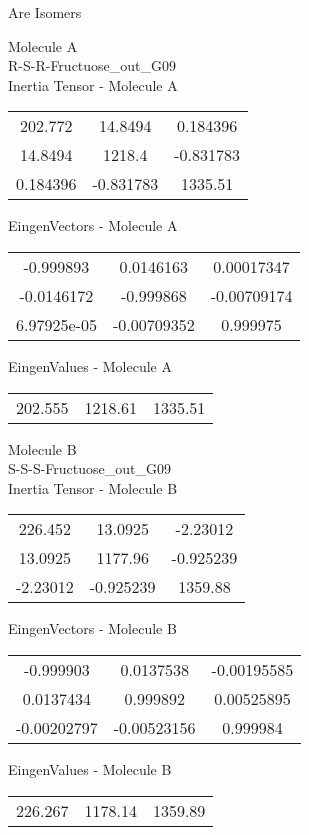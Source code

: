 \begin{center}
\vtab
\vtab
\textcolor{NavyBlue}{\Large Are Isomers}
\end{center}
\newpage
\begin{multicols}{2}
\begin{center}
Molecule A \\ 
R-S-R-Fructuose\_out\_G09
\\
Inertia Tensor - Molecule A \\
\vtab
\begin{tabular}{|c c c|}
202.772	 & 	14.8494	 & 	0.184396	 \\
14.8494	 & 	1218.4	 & 	-0.831783	 \\
0.184396	 & 	-0.831783	 & 	1335.51
\end{tabular}

\vtab
 EingenVectors - Molecule A     \\
\vtab
\begin{tabular}{|c c c|}
-0.999893	 & 	0.0146163	 & 	0.00017347	 \\
-0.0146172	 & 	-0.999868	 & 	-0.00709174	 \\
6.97925e-05	 & 	-0.00709352	 & 	0.999975
\end{tabular}

\vtab
 EingenValues - Molecule A     \\
\vtab
\begin{tabular}{|c c c|}
202.555	 & 	1218.61	 & 	1335.51
\end{tabular}
\columnbreak

Molecule B \\ 
S-S-S-Fructuose\_out\_G09
\\
Inertia Tensor - Molecule B \\
\vtab
\begin{tabular}{|c c c|}
226.452	 & 	13.0925	 & 	-2.23012	 \\
13.0925	 & 	1177.96	 & 	-0.925239	 \\
-2.23012	 & 	-0.925239	 & 	1359.88
\end{tabular}

\vtab
 EingenVectors - Molecule B     \\
\vtab
\begin{tabular}{|c c c|}
-0.999903	 & 	0.0137538	 & 	-0.00195585	 \\
0.0137434	 & 	0.999892	 & 	0.00525895	 \\
-0.00202797	 & 	-0.00523156	 & 	0.999984
\end{tabular}

\vtab
 EingenValues - Molecule B     \\
\vtab
\begin{tabular}{|c c c|}
226.267	 & 	1178.14	 & 	1359.89
\end{tabular}

\end{center}
\end{multicols}
